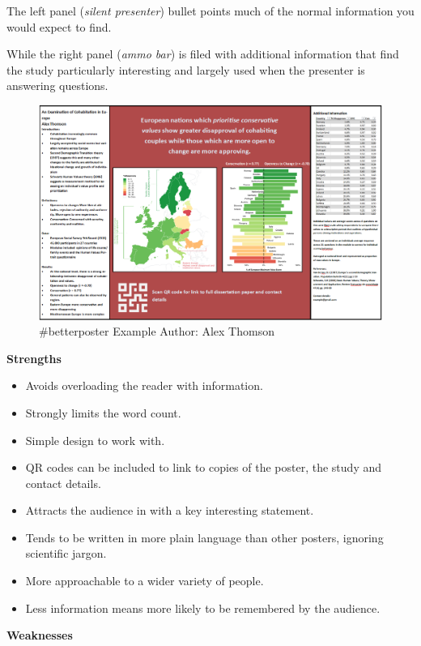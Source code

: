 \documentclass[
]{book}
\providecommand{\tightlist}{%
  \setlength{\itemsep}{0pt}\setlength{\parskip}{0pt}}
\begin{document}
The left panel (\emph{silent presenter}) bullet points much of the normal information you would expect to find.

While the right panel (\emph{ammo bar}) is filed with additional information that find the study particularly interesting and largely used when the presenter is answering questions.

\begin{figure}
\centering
\includegraphics{img/better poster example 1.png}
\caption{\#betterposter Example Author: Alex Thomson}
\end{figure}

\textbf{Strengths}

\begin{itemize}
\tightlist
\item
  Avoids overloading the reader with information.
\item
  Strongly limits the word count.
\item
  Simple design to work with.
\item
  QR codes can be included to link to copies of the poster, the study and contact details.
\item
  Attracts the audience in with a key interesting statement.
\item
  Tends to be written in more plain language than other posters, ignoring scientific jargon.
\item
  More approachable to a wider variety of people.
\item
  Less information means more likely to be remembered by the audience.
\end{itemize}

\textbf{Weaknesses}
\end{document}
